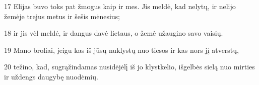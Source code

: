 \par 17 Elijas buvo toks pat žmogus kaip ir mes. Jis meldė, kad nelytų, ir nelijo žemėje trejus metus ir šešis mėnesius; 
\par 18 ir jis vėl meldė, ir dangus davė lietaus, o žemė užaugino savo vaisių. 
\par 19 Mano broliai, jeigu kas iš jūsų nuklystų nuo tiesos ir kas nors jį atverstų,­ 
\par 20 težino, kad, sugrąžindamas nusidėjėlį iš jo klystkelio, išgelbės sielą nuo mirties ir uždengs daugybę nuodėmių.



